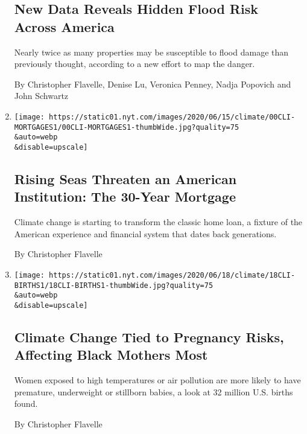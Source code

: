 \begin{enumerate}
{  \subsection{New Data Reveals Hidden Flood Risk Across
  America}\label{new-data-reveals-hidden-flood-risk-across-america}}

  Nearly twice as many properties may be susceptible to flood damage
  than previously thought, according to a new effort to map the danger.

  By Christopher Flavelle, Denise Lu, Veronica Penney, Nadja Popovich
  and John Schwartz
\item
  \href{/2020/06/19/climate/climate-seas-30-year-mortgage.html}{}

  \texttt{[image: https://static01.nyt.com/images/2020/06/15/climate/00CLI-MORTGAGES1/00CLI-MORTGAGES1-thumbWide.jpg?quality=75\\\&auto=webp\\\&disable=upscale]}

  \hypertarget{rising-seas-threaten-an-american-institution-the-30-year-mortgage}{%
  \subsection{Rising Seas Threaten an American Institution: The 30-Year
  Mortgage}\label{rising-seas-threaten-an-american-institution-the-30-year-mortgage}}

  Climate change is starting to transform the classic home loan, a
  fixture of the American experience and financial system that dates
  back generations.

  By Christopher Flavelle
\item
  \href{/2020/06/18/climate/climate-change-pregnancy-study.html}{}

  \texttt{[image: https://static01.nyt.com/images/2020/06/18/climate/18CLI-BIRTHS1/18CLI-BIRTHS1-thumbWide.jpg?quality=75\\\&auto=webp\\\&disable=upscale]}

  \hypertarget{climate-change-tied-to-pregnancy-risks-affecting-black-mothers-most}{%
  \subsection{Climate Change Tied to Pregnancy Risks, Affecting Black
  Mothers
  Most}\label{climate-change-tied-to-pregnancy-risks-affecting-black-mothers-most}}

  Women exposed to high temperatures or air pollution are more likely to
  have premature, underweight or stillborn babies, a look at 32 million
  U.S. births found.

  By Christopher Flavelle
\end{enumerate}

